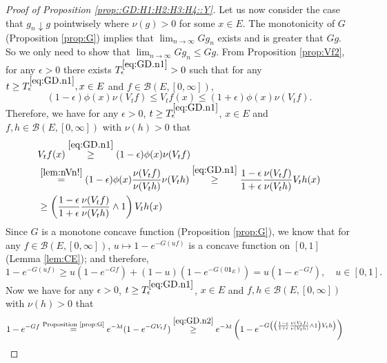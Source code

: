 \documentclass[12pt,a4paper]{amsart}
\numberwithin{equation}{section}
\theoremstyle{plain}
\theoremstyle{definition}
\theoremstyle{remark}
\begin{document}
\begin{proof}[Proof of Proposition \ref{prop::GD:H1:H2:H3:H4::Y}]
	Let us now consider the case that $g_n \downarrow g$ pointwisely where $\nu(g) > 0$ for some $x\in E$. 
	The monotonicity of $G$ (Proposition \ref{prop:G}) implies that $\lim_{n \to \infty} Gg_n$ exists and is greater that $G g$.  
	So we only need to show that $\lim_{n\to \infty} Gg_n \leq Gg$. 
	From Proposition \ref{prop:Vf2}, for any $\epsilon>0$ there exists $T_\epsilon^{\eqref{eq:GD.n1}} >0$ such that for any $t\geq T_\epsilon^{\eqref{eq:GD.n1}}, x\in E$ and $f\in \mathcal B(E,[0,\infty])$, 
\begin{equation} \label{eq:GD.n1} 
	(1-\epsilon)\phi(x) \nu(V_tf)\leq V_tf(x) 
	\leq (1+\epsilon)\phi(x) \nu(V_tf). 
\end{equation} 
	Therefore, we have for any $\epsilon>0$, $t \geq T_\epsilon^{\eqref{eq:GD.n1}}$, $x\in E$ and $f, h\in \mathcal B(E,[0,\infty])$ with $\nu(h) >0$ that 
\begin{align} 
	&V_tf(x) 
	\overset{\eqref{eq:GD.n1}}\geq (1-\epsilon)\phi(x) \nu(V_tf) 
	\\& \overset{\eqref{lem:nVn!}}= (1-\epsilon)\phi(x) \frac{\nu(V_tf)}{\nu(V_th)} \nu(V_th)
	\overset{\eqref{eq:GD.n1}}\geq \frac{1-\epsilon}{1+\epsilon} \frac{\nu(V_tf)}{\nu(V_th)} V_th(x)
	\\ \label{eq:GD.n2} & \geq \left(\frac{1-\epsilon}{1+\epsilon} \frac{\nu(V_tf)}{\nu(V_th)} \wedge 1\right) V_th(x)
\end{align}
	Since $G$ is a monotone concave function (Proposition \ref{prop:G}), we know that for any $f\in \mathcal B(E,[0,\infty])$, $u \mapsto 1 - e^{-G(uf)}$ is a concave function on $[0,1]$ (Lemma \ref{lem:CE}); and therefore, 
\begin{equation} \label{eq:GD.n3}
	1 - e^{- G(uf)}\geq u(1- e^{- Gf}) + (1-u) (1- e^{- G(0 \mathbf 1_E)}) = u(1- e^{- Gf}), \quad u \in [0,1].
\end{equation}
	Now we have for any $\epsilon>0$, $t \geq T_\epsilon^{\eqref{eq:GD.n1}}$, $x\in E$ and $f, h\in \mathcal B(E,[0,\infty])$ with $\nu(h) >0$ that 
\begin{align}
	&1 - e^{-Gf} 
	\overset{\text{Proposition \ref{prop:G}}}= e^{-\lambda t}(1- e^{- GV_t f})
	\overset{\eqref{eq:GD.n2}}\geq e^{-\lambda t}\left(1- e^{- G\left( \left(\frac{1-\epsilon}{1+\epsilon} \frac{\nu(V_tf)}{\nu(V_th)} \wedge 1\right) V_th\right) }\right)

\end{align}
\end{proof}
\end{document}
